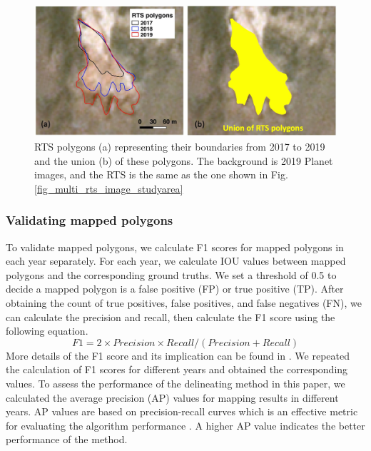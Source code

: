 \documentclass[authoryear,preprint,review,12pt]{elsarticle}
\begin{document}
\begin{figure} 
	\centering
	\includegraphics[width=14cm]{figs/rts_expanding_example_trim.jpg}
	\caption{RTS polygons (a) representing their boundaries from 2017 to 2019 and the union (b) of these polygons. The background is 2019 Planet images, and the RTS is the same as the one shown in Fig. \ref{fig_multi_rts_image_studyarea}}
	\label{fig_rts_expanding}
\end{figure}


\subsubsection{Validating mapped polygons}
\label{sec_validate_mapped_polygons}

To validate mapped polygons, we calculate F1 scores for mapped polygons in each year separately. 
For each year, we calculate IOU values between mapped polygons and the corresponding ground truths. 
We set a threshold of 0.5 to decide a mapped polygon is a false positive (FP) or true positive (TP).
After obtaining the count of true positives, false positives, and false negatives (FN), we can calculate the precision and recall, then calculate the F1 score using the following equation. 
\begin{equation}
F1=2 \times Precision \times Recall / (Precision + Recall)
\label{equ_f1score}
\end{equation}
More details of the F1 score and its implication can be found in \cite{huang2020using}.
We repeated the calculation of F1 scores for different years and obtained the corresponding values. 
To assess the performance of the delineating method in this paper, we calculated the average precision (AP) values for mapping results in different years. %
AP values are based on precision-recall curves which is an effective metric for evaluating the algorithm performance \citep{huang2020using}.
A higher AP value indicates the better performance of the method. 
\end{document}
